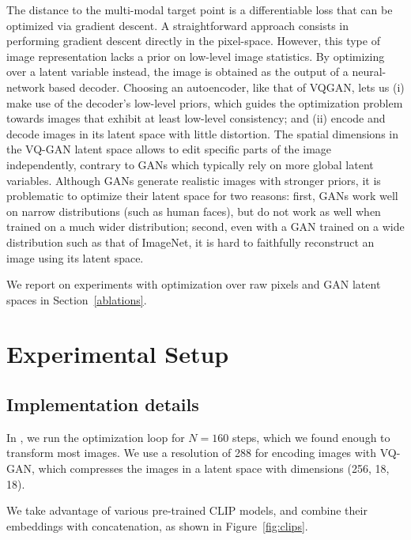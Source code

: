 The distance to the multi-modal target point is a differentiable loss that can be 
optimized via gradient descent. A straightforward approach consists in performing
 gradient descent directly in the pixel-space. However, this type of image 
 representation lacks a  prior on low-level image statistics. 
By optimizing over a  latent variable instead, the  image is obtained as the
 output of a neural-network based decoder. Choosing an autoencoder, like that of 
 VQGAN, lets us (i) make use of the decoder's low-level priors, which guides the 
 optimization problem towards images that exhibit at least low-level consistency;
  and (ii) encode and decode images in its latent space with little distortion. 
  The spatial dimensions in the VQ-GAN latent space allows to edit specific parts
   of the image independently, contrary to \ac{GAN}s which typically rely on more global 
   latent variables. 
Although \ac{GAN}s generate realistic images with stronger priors, it is problematic to
 optimize their latent space for two reasons: first, \ac{GAN}s work  well on narrow 
 distributions (such as human faces), but do not work as well when trained  on a much 
 wider distribution;
second, even with a \ac{GAN} trained on a wide distribution such as that of ImageNet, it
 is hard to faithfully reconstruct  an image using its  latent space.

We report on experiments with optimization over raw pixels and \ac{GAN} latent spaces in  
Section~\ref{ablations}.



\section{Experimental Setup}


\subsection{Implementation details}\label{sub_section:implementation_details}

In \ours, we run the optimization loop for $N=160$ steps, which we found enough to 
transform most images. We use a resolution of 288 for encoding images with VQ-GAN,
 which compresses the images in a latent space with dimensions (256, 18, 18). 

We take advantage of  various pre-trained \ac{CLIP} models, and combine their embeddings
 with concatenation, as shown in Figure~\ref{fig:clips}. 

